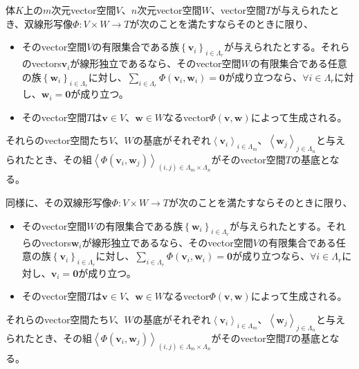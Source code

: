 \documentclass[dvipdfmx]{jsarticle}
\begin{document}
\begin{thm}\label{2.4.5.2}
体$K$上の$m$次元vector空間$V$、$n$次元vector空間$W$、vector空間$T$が与えられたとき、双線形写像$\varPhi:V \times W \rightarrow T$が次のことを満たすならそのときに限り、
\begin{itemize}
\item
  そのvector空間$V$の有限集合である族$\left\{ \mathbf{v}_{i} \right\}_{i \in \varLambda_{r}}$が与えられたとする。それらのvectors$\mathbf{v}_{i}$が線形独立であるなら、そのvector空間$W$の有限集合である任意の族$\left\{ \mathbf{w}_{i} \right\}_{i \in \varLambda_{r}}$に対し、$\sum_{i \in \varLambda_{r}} {\varPhi\left( \mathbf{v}_{i},\mathbf{w}_{i} \right)} = \mathbf{0}$が成り立つなら、$\forall i \in \varLambda_{r}$に対し、$\mathbf{w}_{i} = \mathbf{0}$が成り立つ。
\item
  そのvector空間$T$は$\mathbf{v} \in V$、$\mathbf{w} \in W$なるvector$\varPhi\left( \mathbf{v},\mathbf{w} \right)$によって生成される。
\end{itemize}
それらのvector空間たち$V$、$W$の基底がそれぞれ$\left\langle \mathbf{v}_{i} \right\rangle_{i \in \varLambda_{m}}$、$\left\langle \mathbf{w}_{j} \right\rangle_{j \in \varLambda_{n}}$と与えられたとき、その組$\left\langle \varPhi\left( \mathbf{v}_{i},\mathbf{w}_{j} \right) \right\rangle_{(i,j) \in \varLambda_{m} \times \varLambda_{n}}$がそのvector空間$T$の基底となる。\par
同様に、その双線形写像$\varPhi:V \times W \rightarrow T$が次のことを満たすならそのときに限り、
\begin{itemize}
\item
  そのvector空間$W$の有限集合である族$\left\{ \mathbf{w}_{i} \right\}_{i \in \varLambda_{r}}$が与えられたとする。それらのvectors$\mathbf{w}_{i}$が線形独立であるなら、そのvector空間$V$の有限集合である任意の族$\left\{ \mathbf{v}_{i} \right\}_{i \in \varLambda_{r}}$に対し、$\sum_{i \in \varLambda_{r}} {\varPhi\left( \mathbf{v}_{i},\mathbf{w}_{i} \right)} = \mathbf{0}$が成り立つなら、$\forall i \in \varLambda_{r}$に対し、$\mathbf{v}_{i} = \mathbf{0}$が成り立つ。
\item
  そのvector空間$T$は$\mathbf{v} \in V$、$\mathbf{w} \in W$なるvector$\varPhi\left( \mathbf{v},\mathbf{w} \right)$によって生成される。
\end{itemize}
それらのvector空間たち$V$、$W$の基底がそれぞれ$\left\langle \mathbf{v}_{i} \right\rangle_{i \in \varLambda_{m}}$、$\left\langle \mathbf{w}_{j} \right\rangle_{j \in \varLambda_{n}}$と与えられたとき、その組$\left\langle \varPhi\left( \mathbf{v}_{i},\mathbf{w}_{j} \right) \right\rangle_{(i,j) \in \varLambda_{m} \times \varLambda_{n}}$がそのvector空間$T$の基底となる。
\end{thm}
\end{document}
